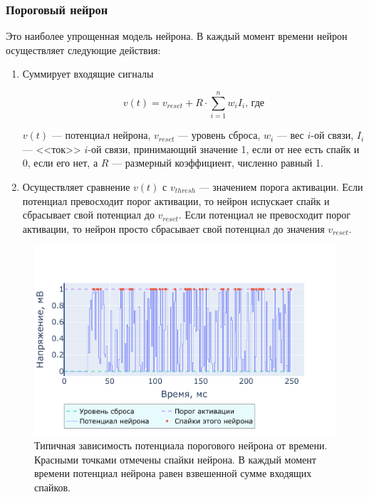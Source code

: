 \documentclass[a4paper]{article}
\begin{document}
\subsubsection{Пороговый нейрон}
Это наиболее упрощенная модель нейрона. В каждый момент времени нейрон осуществляет следующие действия:

\begin{enumerate}
 \item Суммирует входящие сигналы

\begin{equation} \label{eq:thresh}
v(t) = v_{reset} + R \cdot \sum_{i=1}^n {w_i I_i} \text{, где}
\end{equation}

$v(t)$ --- потенциал нейрона, $v_{reset}$ --- уровень сброса, $w_i$ --- вес $i$-ой связи, $I_i$ --- <<ток>> $i$-ой связи, принимающий значение 1, если от нее есть спайк и 0, если его нет, а $R$ --- размерный коэффициент, численно равный 1.

\item Осуществляет сравнение $v(t)$ с $v_{thresh}$ --- значением порога активации. Если потенциал превосходит порог активации, то нейрон испускает спайк и сбрасывает свой потенциал до $v_{reset}$. Если потенциал не превосходит порог активации, то нейрон просто сбрасывает свой потенциал до значения $v_{reset}$.
\end{enumerate}

\begin{center}
\begin{figure}[H] 
 \includegraphics[width=\textwidth,keepaspectratio=true]{model_thresh_ru.pdf}
 \caption{Типичная зависимость потенциала порогового нейрона от времени. Красными точками отмечены спайки нейрона. В каждый момент времени потенциал нейрона равен взвешенной сумме входящих спайков.}
\end{figure}
\end{center}
\end{document}
